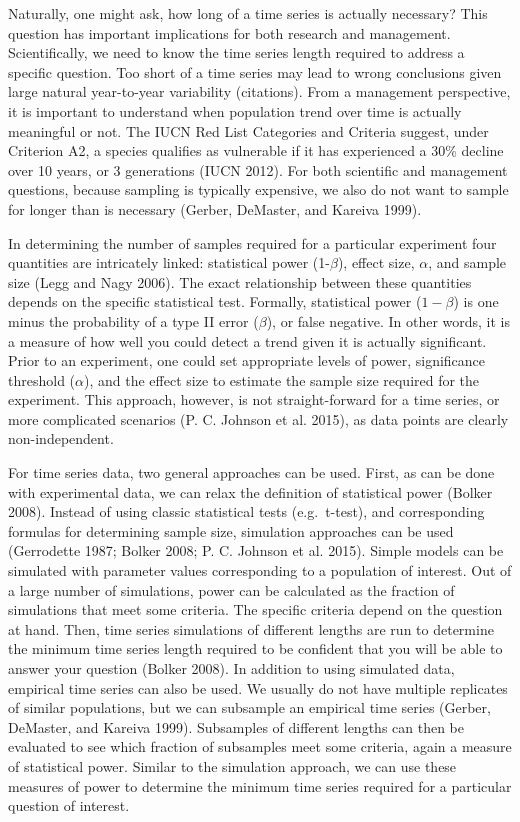 \documentclass[12pt,]{article}
\begin{document}
Naturally, one might ask, how long of a time series is actually
necessary? This question has important implications for both research
and management. Scientifically, we need to know the time series length
required to address a specific question. Too short of a time series may
lead to wrong conclusions given large natural year-to-year variability
(citations). From a management perspective, it is important to
understand when population trend over time is actually meaningful or
not. The IUCN Red List Categories and Criteria suggest, under Criterion
A2, a species qualifies as vulnerable if it has experienced a 30\%
decline over 10 years, or 3 generations (IUCN 2012). For both scientific
and management questions, because sampling is typically expensive, we
also do not want to sample for longer than is necessary (Gerber,
DeMaster, and Kareiva 1999).

In determining the number of samples required for a particular
experiment four quantities are intricately linked: statistical power
(1-\(\beta\)), effect size, \(\alpha\), and sample size (Legg and Nagy
2006). The exact relationship between these quantities depends on the
specific statistical test. Formally, statistical power (\(1-\beta\)) is
one minus the probability of a type II error (\(\beta\)), or false
negative. In other words, it is a measure of how well you could detect a
trend given it is actually significant. Prior to an experiment, one
could set appropriate levels of power, significance threshold
(\(\alpha\)), and the effect size to estimate the sample size required
for the experiment. This approach, however, is not straight-forward for
a time series, or more complicated scenarios (P. C. Johnson et al.
2015), as data points are clearly non-independent.

For time series data, two general approaches can be used. First, as can
be done with experimental data, we can relax the definition of
statistical power (Bolker 2008). Instead of using classic statistical
tests (e.g.~t-test), and corresponding formulas for determining sample
size, simulation approaches can be used (Gerrodette 1987; Bolker 2008;
P. C. Johnson et al. 2015). Simple models can be simulated with
parameter values corresponding to a population of interest. Out of a
large number of simulations, power can be calculated as the fraction of
simulations that meet some criteria. The specific criteria depend on the
question at hand. Then, time series simulations of different lengths are
run to determine the minimum time series length required to be confident
that you will be able to answer your question (Bolker 2008). In addition
to using simulated data, empirical time series can also be used. We
usually do not have multiple replicates of similar populations, but we
can subsample an empirical time series (Gerber, DeMaster, and Kareiva
1999). Subsamples of different lengths can then be evaluated to see
which fraction of subsamples meet some criteria, again a measure of
statistical power. Similar to the simulation approach, we can use these
measures of power to determine the minimum time series required for a
particular question of interest.
\end{document}
